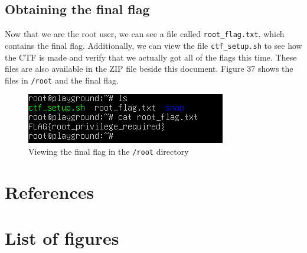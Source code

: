 \documentclass[a4paper]{article}
\newcommand{\abc}{\hfill \break}
\begin{document}
\subsection{Obtaining the final flag}
Now that we are the root user, we can see a file called \texttt{root\_flag.txt}, which contains the final flag. Additionally, we can view the file \texttt{ctf\_setup.sh} to see how the CTF is made and verify that we actually got all of the flags this time. These files are also available in the ZIP file beside this document. Figure 37 shows the files in \texttt{/root} and the final flag.
\begin{figure}[h]
	\includegraphics[scale=0.75]{images/ogm.png}
	\centering
	\caption{Viewing the final flag in the \texttt{/root} directory}
\end{figure}\abc

\newpage
\section{References}

\newpage
\section{List of figures}

\listoffigures
\end{document}
